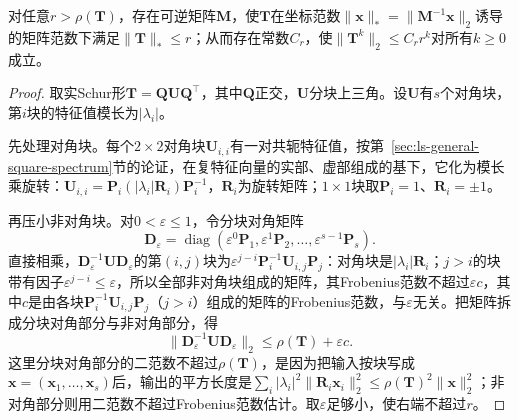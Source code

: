 \begin{lemma}[矩阵幂的几何上界]
\label{lem:ls-power-geometric-bound}
对任意$r>\rho(\bm T)$，存在可逆矩阵$\bm M$，使$\bm T$在坐标范数$\lVert\bm x\rVert_*=\lVert\bm M^{-1}\bm x\rVert_2$诱导的矩阵范数下满足$\lVert\bm T\rVert_*\leq r$；从而存在常数$C_r$，使$\lVert\bm T^k\rVert_2\leq C_rr^k$对所有$k\geq0$成立。
\end{lemma}
\begin{proof}
取实Schur形$\bm T=\bm Q\bm U\bm Q^\top$，其中$\bm Q$正交，$\bm U$分块上三角。设$\bm U$有$s$个对角块，第$i$块的特征值模长为$|\lambda_i|$。

先处理对角块。每个$2\times2$对角块$\bm U_{i,i}$有一对共轭特征值，按第~\ref{sec:ls-general-square-spectrum}节的论证，在复特征向量的实部、虚部组成的基下，它化为模长乘旋转：$\bm U_{i,i}=\bm P_i(|\lambda_i|\bm R_i)\bm P_i^{-1}$，$\bm R_i$为旋转矩阵；$1\times1$块取$\bm P_i=1$、$\bm R_i=\pm1$。

再压小非对角块。对$0<\varepsilon\leq1$，令分块对角矩阵
\[
 \bm D_\varepsilon=\operatorname{diag}(\varepsilon^{0}\bm P_1,\varepsilon^{1}\bm P_2,\ldots,\varepsilon^{s-1}\bm P_s).
\]
直接相乘，$\bm D_\varepsilon^{-1}\bm U\bm D_\varepsilon$的第$(i,j)$块为$\varepsilon^{j-i}\bm P_i^{-1}\bm U_{i,j}\bm P_j$：对角块是$|\lambda_i|\bm R_i$；$j>i$的块带有因子$\varepsilon^{j-i}\leq\varepsilon$，所以全部非对角块组成的矩阵，其Frobenius范数不超过$\varepsilon c$，其中$c$是由各块$\bm P_i^{-1}\bm U_{i,j}\bm P_j$（$j>i$）组成的矩阵的Frobenius范数，与$\varepsilon$无关。把矩阵拆成分块对角部分与非对角部分，得
\[
 \lVert\bm D_\varepsilon^{-1}\bm U\bm D_\varepsilon\rVert_2\leq\rho(\bm T)+\varepsilon c .
\]
这里分块对角部分的二范数不超过$\rho(\bm T)$，是因为把输入按块写成$\bm x=(\bm x_1,\ldots,\bm x_s)$后，输出的平方长度是$\sum_i|\lambda_i|^2\lVert\bm R_i\bm x_i\rVert_2^2\leq\rho(\bm T)^2\lVert\bm x\rVert_2^2$；非对角部分则用二范数不超过Frobenius范数估计。取$\varepsilon$足够小，使右端不超过$r$。


\end{proof}
